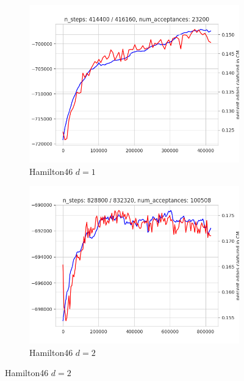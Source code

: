\begin{figure}
  \vspace{1em}
  \begin{subfigure}{0.49\textwidth}
    \centering
    \includegraphics[width=\linewidth]{figures/MCMC_plots/socfb-Hamilton46-1d.png}
    \caption{Hamilton46 $d=1$}
  \end{subfigure}
  \hfill
  \begin{subfigure}{0.49\textwidth}
    \centering
    \includegraphics[width=\linewidth]{figures/MCMC_plots/socfb-Hamilton46-2d.png}
    \caption{Hamilton46 $d=2$}
  \end{subfigure}



\end{figure}
